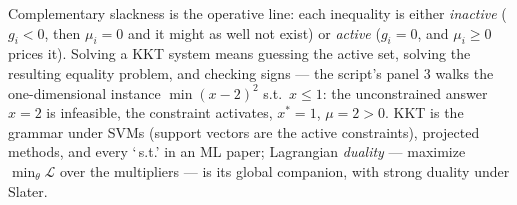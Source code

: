 \documentclass[11pt]{article}
\begin{document}
Complementary slackness is the operative line: each inequality is either
\emph{inactive} ($g_i < 0$, then $\mu_i = 0$ and it might as well not
exist) or \emph{active} ($g_i = 0$, and $\mu_i \ge 0$ prices it).
Solving a KKT system means guessing the active set, solving the resulting
equality problem, and checking signs --- the script's panel 3 walks the
one-dimensional instance $\min (x-2)^2$ s.t.\ $x \le 1$: the
unconstrained answer $x=2$ is infeasible, the constraint activates,
$x^\ast = 1$, $\mu = 2 > 0$. KKT is the grammar under SVMs (support
vectors are the active constraints), projected methods, and every
`\,s.t.' in an ML paper; Lagrangian \emph{duality} — maximize
$\min_\theta \mathcal{L}$ over the multipliers — is its global companion,
with strong duality under Slater.
\end{document}

